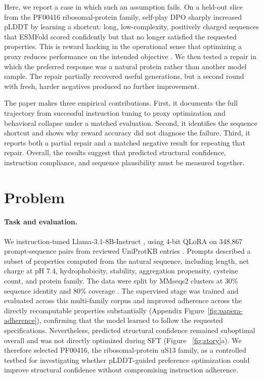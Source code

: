 \documentclass{article}
\begin{document}
Here, we report a case in which such an assumption fails. On a held-out slice from the
PF00416 ribosomal-protein family, self-play DPO sharply increased pLDDT by
learning a shortcut: long, low-complexity, positively charged sequences that
ESMFold scored confidently but that no longer satisfied the requested
properties. This is reward hacking in the operational sense that optimizing a
proxy reduces performance on the intended objective
\citep{skalse2022reward}. We then tested a repair in which the preferred
response was a natural protein rather than another model sample. The repair
partially recovered useful generations, but a second round with fresh,
harder negatives produced no further improvement.

The paper makes three empirical contributions. First, it documents the full
trajectory from successful instruction tuning to proxy optimization and
behavioral collapse under a matched evaluation. Second, it identifies the
sequence shortcut and shows why reward accuracy did not diagnose the failure.
Third, it reports both a partial repair and a matched negative result for
repeating that repair. Overall, the results suggest that predicted structural
confidence, instruction compliance, and sequence plausibility must be measured
together.

\section{Problem}
\label{sec:problem}

\paragraph{Task and evaluation.}
We instruction-tuned Llama-3.1-8B-Instruct
\citep{grattafiori2024llama3}, using 4-bit QLoRA
\citep{hu2022lora,dettmers2023qlora} on 348{,}867 prompt-sequence pairs from
reviewed UniProtKB entries \citep{uniprot2023}. Prompts described a subset of
properties computed from the natural sequence, including length, net charge at
pH 7.4, hydrophobicity, stability, aggregation propensity, cysteine count, and
protein family. The data were split by MMseqs2 clusters at 30\% sequence
identity and 80\% coverage \citep{steinegger2017mmseqs2}. The supervised stage was trained and evaluated across this multi-family corpus and improved adherence across the directly recomputable properties substantially (Appendix Figure~\ref{fig:papera-adherence}), confirming that the model learned to follow the requested specifications. Nevertheless, predicted structural confidence remained suboptimal overall and was not directly optimized during SFT (Figure ~\ref{fig:story}a). We therefore selected PF00416, the ribosomal-protein uS13 family, as a controlled testbed for investigating whether pLDDT-guided preference optimization could improve structural confidence without compromising instruction adherence.
\end{document}
